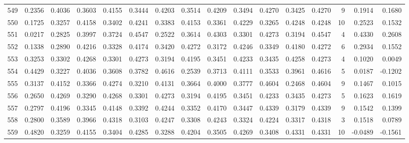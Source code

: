 \begin{tabular}{lrrrrrrrrrrrrrrr}
549 &      0.2356 &  0.4036 &  0.3603 &  0.4155 &  0.3444 &  0.4203 &  0.3514 &  0.4209 &  0.3494 &  0.4270 &   0.3425 &     0.4270 &      9 &                    0.1914 &                     0.1680 \\
550 &      0.1725 &  0.3257 &  0.4158 &  0.3402 &  0.4241 &  0.3383 &  0.4153 &  0.3361 &  0.4229 &  0.3265 &   0.4248 &     0.4248 &     10 &                    0.2523 &                     0.1532 \\
551 &      0.0217 &  0.2825 &  0.3997 &  0.3724 &  0.4547 &  0.2522 &  0.3614 &  0.4303 &  0.3301 &  0.4273 &   0.3194 &     0.4547 &      4 &                    0.4330 &                     0.2608 \\
552 &      0.1338 &  0.2890 &  0.4216 &  0.3328 &  0.4174 &  0.3420 &  0.4272 &  0.3172 &  0.4246 &  0.3349 &   0.4180 &     0.4272 &      6 &                    0.2934 &                     0.1552 \\
553 &      0.3253 &  0.3302 &  0.4268 &  0.3301 &  0.4273 &  0.3194 &  0.4195 &  0.3451 &  0.4233 &  0.3435 &   0.4258 &     0.4273 &      4 &                    0.1020 &                     0.0049 \\
554 &      0.4429 &  0.3227 &  0.4036 &  0.3608 &  0.3782 &  0.4616 &  0.2539 &  0.3713 &  0.4111 &  0.3533 &   0.3961 &     0.4616 &      5 &                    0.0187 &                    -0.1202 \\
555 &      0.3137 &  0.4152 &  0.3366 &  0.4274 &  0.3210 &  0.4131 &  0.3664 &  0.4000 &  0.3777 &  0.4604 &   0.2468 &     0.4604 &      9 &                    0.1467 &                     0.1015 \\
556 &      0.2650 &  0.4269 &  0.3290 &  0.4268 &  0.3301 &  0.4273 &  0.3194 &  0.4195 &  0.3451 &  0.4233 &   0.3435 &     0.4273 &      5 &                    0.1623 &                     0.1619 \\
557 &      0.2797 &  0.4196 &  0.3345 &  0.4148 &  0.3392 &  0.4244 &  0.3352 &  0.4170 &  0.3447 &  0.4339 &   0.3179 &     0.4339 &      9 &                    0.1542 &                     0.1399 \\
558 &      0.2800 &  0.3589 &  0.3966 &  0.4318 &  0.3103 &  0.4247 &  0.3308 &  0.4243 &  0.3324 &  0.4224 &   0.3317 &     0.4318 &      3 &                    0.1518 &                     0.0789 \\
559 &      0.4820 &  0.3259 &  0.4155 &  0.3404 &  0.4285 &  0.3288 &  0.4204 &  0.3505 &  0.4269 &  0.3408 &   0.4331 &     0.4331 &     10 &                   -0.0489 &                    -0.1561 \\

\end{tabular}
